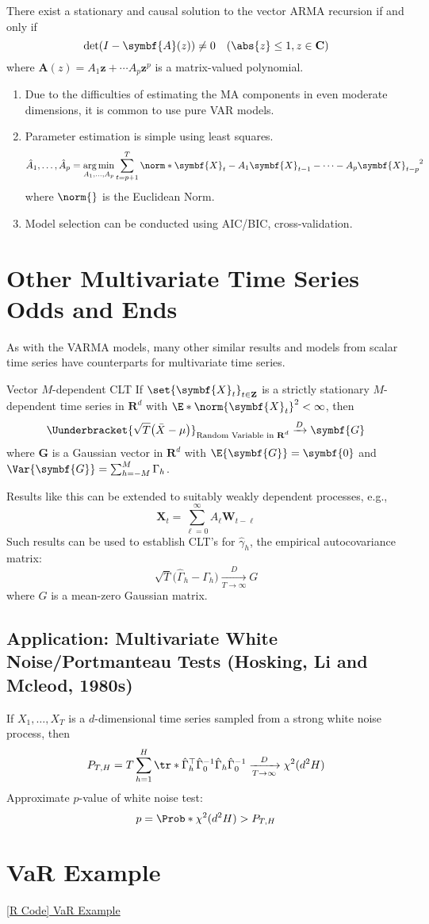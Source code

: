 \begin{Theorem}{}{}
    There exist a stationary and causal solution to the vector ARMA recursion if and only if
    \[ \det(I-\symbf{A}(z))\ne 0\quad(\abs{z}\le 1,z\in\mathbf{C}) \]
    where $ \symbf{A}(z)=A_1 \symbf{z}+\cdots A_p \symbf{z}^p $ is a matrix-valued polynomial.
\end{Theorem}
\begin{Remark}{}{}
    \begin{enumerate}[(1)]
        \item Due to the difficulties of estimating the MA components in even moderate dimensions,
              it is common to use pure VAR models.
        \item Parameter estimation is simple using least squares.
              \[ \hat{A}_1,\ldots,\hat{A}_p=\argmin_{A_1,\ldots,A_p}
                  \sum_{t=p+1}^{T}\norm*{\symbf{X}_t-A_1 \symbf{X}_{t-1}-\cdots -A_p \symbf{X}_{t-p}}^2  \]
              where $ \norm{} $ is the Euclidean Norm.
        \item Model selection can be conducted using AIC/BIC, cross-validation.
    \end{enumerate}
\end{Remark}
\section{Other Multivariate Time Series Odds and Ends}
As with the VARMA models, many other similar results and models
from scalar time series have counterparts for multivariate time series.
\begin{Theorem}{Vector $ M $-dependent CLT}{}
    If $ \set{\symbf{X}_t}_{t\in\mathbf{Z}} $ is a strictly stationary $ M $-dependent
    time series in $ \mathbf{R}^d $ with $ \E*{\norm{\symbf{X}_t}^2}<\infty $, then
    \[ \Uunderbracket{\sqrt{T}\bigl(\bar{X}-\mu\bigr)}_{\text{Random Variable in $ \mathbf{R}^d $}}\xrightarrow{D}\symbf{G} \]
    where $ \symbf{G} $ is a Gaussian vector in $ \mathbf{R}^d $
    with $ \E{\symbf{G}}=\symbf{0} $ and $ \Var{\symbf{G}}=\sum_{h=-M}^{M} \Gamma_h $.
\end{Theorem}
Results like this can be extended to suitably weakly dependent processes, e.g.,
\[ \symbf{X}_t=\sum_{\ell=0}^{\infty} A_\ell \symbf{W}_{t-\ell} \]
Such results can be used to establish CLT's for $ \hat{\gamma}_h $,
the empirical autocovariance matrix:
\[ \sqrt{T}\bigl(\hat{\Gamma}_h-\Gamma_h\bigr)\xrightarrow[T\to\infty]{D}G \]
where $ G $ is a mean-zero Gaussian matrix.
\subsection*{Application: Multivariate White Noise/Portmanteau Tests (Hosking, Li and Mcleod, 1980s)}
If $ X_1,\ldots,X_T $ is a $ d $-dimensional time series sampled from a strong white noise process, then
\[ P_{T,H}=T \sum_{h=1}^{H} \tr*{\hat{\Gamma}_h^\top \hat{\Gamma}_0^{-1}\hat{\Gamma}_h\hat{\Gamma}_0^{-1}}
    \xrightarrow[T\to\infty]{D}\chi^2(d^2 H) \]
Approximate $ p $-value of white noise test:
\[ p=\Prob*{\chi^2(d^2 H)>P_{T,H}} \]
\section{VaR Example}
\href{https://github.com/Hextical/university-notes/blob/master/year-3/semester-2/STAT%20443/code/11.4%20-%20VaR%20Example.R}{[R Code] VaR Example}
